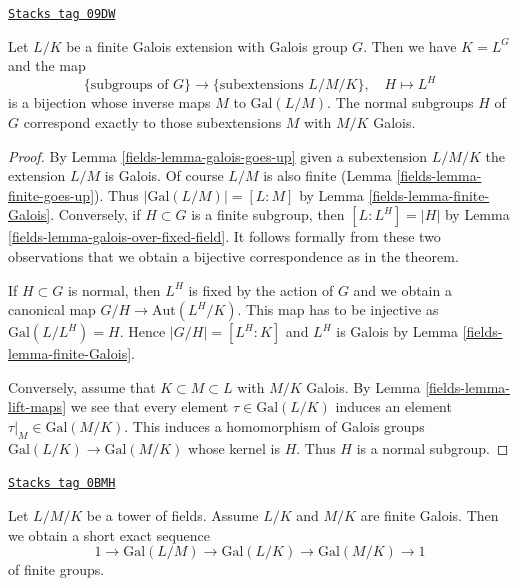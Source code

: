 \begin{theorem}

\label{fields-theorem-galois-theory}
\href{https://stacks.math.columbia.edu/tag/09DW}{\texttt{Stacks tag 09DW}}

Let $L/K$ be a finite Galois extension with Galois group $G$.
Then we have $K = L^G$ and the map
$$
\{\text{subgroups of }G\}
\longrightarrow
\{\text{subextensions }L/M/K\},\quad
H \longmapsto L^H
$$
is a bijection whose inverse maps $M$ to $\text{Gal}(L/M)$.
The normal subgroups $H$ of $G$ correspond exactly to those
subextensions $M$ with $M/K$ Galois.
\end{theorem}

\begin{proof}

By Lemma \ref{fields-lemma-galois-goes-up} given a subextension $L/M/K$
the extension $L/M$ is Galois. Of course $L/M$ is also finite
(Lemma \ref{fields-lemma-finite-goes-up}). Thus $|\text{Gal}(L/M)| = [L : M]$
by Lemma \ref{fields-lemma-finite-Galois}.
Conversely, if $H \subset G$ is a finite subgroup, then
$[L : L^H] = |H|$ by Lemma \ref{fields-lemma-galois-over-fixed-field}.
It follows formally from these two observations that we obtain
a bijective correspondence as in the theorem.

\medskip\noindent
If $H \subset G$ is normal, then $L^H$ is fixed by the action of
$G$ and we obtain a canonical map $G/H \to \text{Aut}(L^H/K)$.
This map has to be injective as $\text{Gal}(L/L^H) = H$. Hence
$|G/H| = [L^H : K]$ and $L^H$ is Galois by
Lemma \ref{fields-lemma-finite-Galois}.

\medskip\noindent
Conversely, assume that $K \subset M \subset L$ with $M/K$ Galois.
By Lemma \ref{fields-lemma-lift-maps} we see that every
element $\tau \in \text{Gal}(L/K)$ induces an element
$\tau|_M \in \text{Gal}(M/K)$. This induces a homomorphism
of Galois groups $\text{Gal}(L/K) \to \text{Gal}(M/K)$ whose
kernel is $H$. Thus $H$ is a normal subgroup.
\end{proof}

\begin{lemma}
\label{fields-lemma-ses-galois}
\href{https://stacks.math.columbia.edu/tag/0BMH}{\texttt{Stacks tag 0BMH}}

Let $L/M/K$ be a tower of fields. Assume $L/K$ and $M/K$ are finite Galois.
Then we obtain a short exact sequence
$$
1 \to \text{Gal}(L/M) \to \text{Gal}(L/K) \to \text{Gal}(M/K) \to 1
$$
of finite groups.
\end{lemma}

